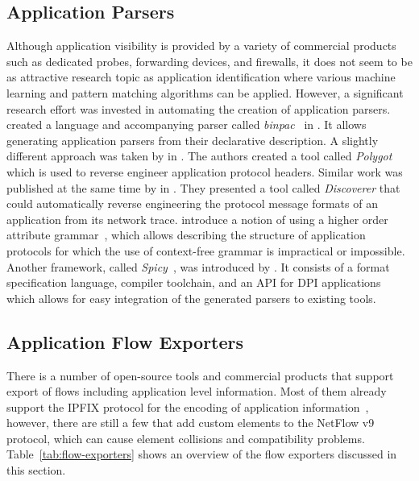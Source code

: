\subsection{Application Parsers}
Although application visibility is provided by a variety of commercial products such as dedicated probes, forwarding devices, and firewalls, it does not seem to be as attractive research topic as application identification where various machine learning and pattern matching algorithms can be applied. However, a significant research effort was invested in automating the creation of application parsers. \citeauthor{Pang-2006-binpac} created a language and accompanying parser called \emph{binpac}~\cite{Pang-2006-binpac} in \citeyear{Pang-2006-binpac}. It allows generating application parsers from their declarative description. A slightly different approach was taken by \citeauthor{Caballero-2007-Polyglot} in \citeyear{Caballero-2007-Polyglot}. The authors created a tool called \emph{Polygot}~\cite{Caballero-2007-Polyglot} which is used to reverse engineer application protocol headers. Similar work was published at the same time by \citeauthor{Cui-2007-Discoverer} in \cite{Cui-2007-Discoverer}. They presented a tool called \emph{Discoverer} that could automatically reverse engineering the protocol message formats of an application from its network trace. \citeauthor{Davidson-2009-Protocol} introduce a notion of using a higher order attribute grammar~\cite{Davidson-2009-Protocol}, which allows describing the structure of application protocols for which the use of context-free grammar is impractical or impossible. Another framework, called \emph{Spicy}~\cite{Sommer-2016-Spicy}, was introduced by \citeauthor{Sommer-2016-Spicy}. It consists of a format specification language, compiler toolchain, and an API for DPI applications which allows for easy integration of the generated parsers to existing tools.

\subsection{Application Flow Exporters}
There is a number of open-source tools and commercial products that support export of flows including application level information. Most of them already support the IPFIX protocol for the encoding of application information~\cite{Hofstede-2014-Flow}, however, there are still a few that add custom elements to the NetFlow v9 protocol, which can cause element collisions and compatibility problems. Table~\ref{tab:flow-exporters} shows an overview of the flow exporters discussed in this section.

